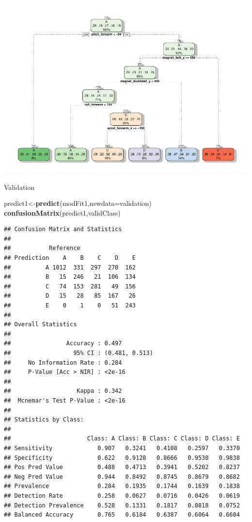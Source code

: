 \documentclass[]{article}
\newenvironment{Shaded}{\begin{snugshade}}{\end{snugshade}}
\newcommand{\KeywordTok}[1]{\textcolor[rgb]{0.13,0.29,0.53}{\textbf{{#1}}}}
\newcommand{\DataTypeTok}[1]{\textcolor[rgb]{0.13,0.29,0.53}{{#1}}}
\newcommand{\StringTok}[1]{\textcolor[rgb]{0.31,0.60,0.02}{{#1}}}
\newcommand{\NormalTok}[1]{{#1}}
\begin{document}
\begin{Shaded}
\end{Shaded}

\includegraphics{./PML4PDF_files/figure-latex/unnamed-chunk-10.pdf}

Validation

\begin{Shaded}
\begin{Highlighting}[]
\NormalTok{predict1<-}\KeywordTok{predict}\NormalTok{(modFit1,}\DataTypeTok{newdata=}\NormalTok{validation)}
\KeywordTok{confusionMatrix}\NormalTok{(predict1,validClass)}
\end{Highlighting}
\end{Shaded}

\begin{verbatim}
## Confusion Matrix and Statistics
## 
##           Reference
## Prediction    A    B    C    D    E
##          A 1012  331  297  270  162
##          B   15  246   21  106  134
##          C   74  153  281   49  156
##          D   15   28   85  167   26
##          E    0    1    0   51  243
## 
## Overall Statistics
##                                         
##                Accuracy : 0.497         
##                  95% CI : (0.481, 0.513)
##     No Information Rate : 0.284         
##     P-Value [Acc > NIR] : <2e-16        
##                                         
##                   Kappa : 0.342         
##  Mcnemar's Test P-Value : <2e-16        
## 
## Statistics by Class:
## 
##                      Class: A Class: B Class: C Class: D Class: E
## Sensitivity             0.907   0.3241   0.4108   0.2597   0.3370
## Specificity             0.622   0.9128   0.8666   0.9530   0.9838
## Pos Pred Value          0.488   0.4713   0.3941   0.5202   0.8237
## Neg Pred Value          0.944   0.8492   0.8745   0.8679   0.8682
## Prevalence              0.284   0.1935   0.1744   0.1639   0.1838
## Detection Rate          0.258   0.0627   0.0716   0.0426   0.0619
## Detection Prevalence    0.528   0.1331   0.1817   0.0818   0.0752
## Balanced Accuracy       0.765   0.6184   0.6387   0.6064   0.6604
\end{verbatim}
\end{document}
